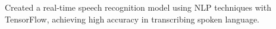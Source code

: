   {Created a real-time speech recognition model using NLP techniques with TensorFlow, achieving high accuracy in transcribing spoken language.}

